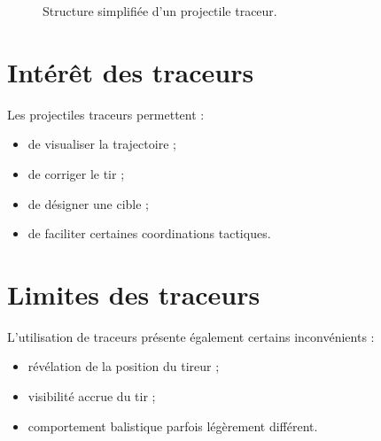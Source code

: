 \begin{figure}[htbp]
\centering


\caption{Structure simplifiée d'un projectile traceur.}
\label{fig:traceur}

\end{figure}

\section{Intérêt des traceurs}

Les projectiles traceurs permettent :

\begin{itemize}
    \item de visualiser la trajectoire ;
    \item de corriger le tir ;
    \item de désigner une cible ;
    \item de faciliter certaines coordinations tactiques.
\end{itemize}

\section{Limites des traceurs}

L'utilisation de traceurs présente également certains inconvénients :

\begin{itemize}
    \item révélation de la position du tireur ;
    \item visibilité accrue du tir ;
    \item comportement balistique parfois légèrement différent.
\end{itemize}

